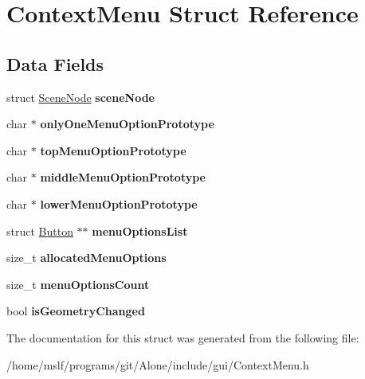 \hypertarget{struct_context_menu}{}\section{Context\+Menu Struct Reference}
\label{struct_context_menu}
\subsection*{Data Fields}
\begin{DoxyCompactItemize}
\item 
\hypertarget{struct_context_menu_aca8025f56fb4ce20b974ec9a3292a9e4}{}\label{struct_context_menu_aca8025f56fb4ce20b974ec9a3292a9e4} 
struct \hyperlink{struct_scene_node}{Scene\+Node} {\bfseries scene\+Node}
\item 
\hypertarget{struct_context_menu_aa6389251f1af7286c5aaa578e346c5dd}{}\label{struct_context_menu_aa6389251f1af7286c5aaa578e346c5dd} 
char $\ast$ {\bfseries only\+One\+Menu\+Option\+Prototype}
\item 
\hypertarget{struct_context_menu_a489cbefce04ee974ad3a4e58b0a0d081}{}\label{struct_context_menu_a489cbefce04ee974ad3a4e58b0a0d081} 
char $\ast$ {\bfseries top\+Menu\+Option\+Prototype}
\item 
\hypertarget{struct_context_menu_a0a8ee24ce84177029e35240a5d6fbac0}{}\label{struct_context_menu_a0a8ee24ce84177029e35240a5d6fbac0} 
char $\ast$ {\bfseries middle\+Menu\+Option\+Prototype}
\item 
\hypertarget{struct_context_menu_a87a9f87725ed2420c45d02d2eb15a77b}{}\label{struct_context_menu_a87a9f87725ed2420c45d02d2eb15a77b} 
char $\ast$ {\bfseries lower\+Menu\+Option\+Prototype}
\item 
\hypertarget{struct_context_menu_ab97fe0e08e073e863f4fd62197738747}{}\label{struct_context_menu_ab97fe0e08e073e863f4fd62197738747} 
struct \hyperlink{struct_button}{Button} $\ast$$\ast$ {\bfseries menu\+Options\+List}
\item 
\hypertarget{struct_context_menu_a1bae963e7309ae68621dd9a07f7d31d6}{}\label{struct_context_menu_a1bae963e7309ae68621dd9a07f7d31d6} 
size\+\_\+t {\bfseries allocated\+Menu\+Options}
\item 
\hypertarget{struct_context_menu_a3cf8669d42fec7e69b5d299de9c30b5a}{}\label{struct_context_menu_a3cf8669d42fec7e69b5d299de9c30b5a} 
size\+\_\+t {\bfseries menu\+Options\+Count}
\item 
\hypertarget{struct_context_menu_a8ea7e8ac3e3330830aa7a4309390f3ac}{}\label{struct_context_menu_a8ea7e8ac3e3330830aa7a4309390f3ac} 
bool {\bfseries is\+Geometry\+Changed}
\end{DoxyCompactItemize}


The documentation for this struct was generated from the following file\+:\begin{DoxyCompactItemize}
\item 
/home/mslf/programs/git/\+Alone/include/gui/Context\+Menu.\+h\end{DoxyCompactItemize}

